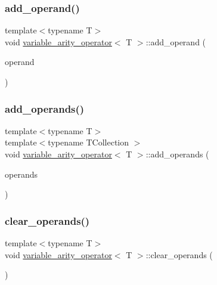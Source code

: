 \subsubsection{\texorpdfstring{add\_operand()}{add\_operand()}}
{\footnotesize\ttfamily template$<$typename T$>$ \\
void \mbox{\hyperlink{classvariable__arity__operator}{variable\+\_\+arity\+\_\+operator}}$<$ T $>$\+::add\+\_\+operand (\begin{DoxyParamCaption}\item[{const T \&}]{operand }\end{DoxyParamCaption})\hspace{0.3cm}{\ttfamily [inline]}}

\mbox{\label{classvariable__arity__operator_a0f78e9be6f6f0b1a1a1767e401f40ac0}} 
\subsubsection{\texorpdfstring{add\_operands()}{add\_operands()}}
{\footnotesize\ttfamily template$<$typename T$>$ \\
template$<$typename T\+Collection $>$ \\
void \mbox{\hyperlink{classvariable__arity__operator}{variable\+\_\+arity\+\_\+operator}}$<$ T $>$\+::add\+\_\+operands (\begin{DoxyParamCaption}\item[{const T\+Collection \&}]{operands }\end{DoxyParamCaption})\hspace{0.3cm}{\ttfamily [inline]}}

\mbox{\label{classvariable__arity__operator_a11b0559752155c5689d18c5ad91f8eec}} 
\subsubsection{\texorpdfstring{clear\_operands()}{clear\_operands()}}
{\footnotesize\ttfamily template$<$typename T$>$ \\
void \mbox{\hyperlink{classvariable__arity__operator}{variable\+\_\+arity\+\_\+operator}}$<$ T $>$\+::clear\+\_\+operands (\begin{DoxyParamCaption}{ }\end{DoxyParamCaption})\hspace{0.3cm}{\ttfamily [inline]}}

